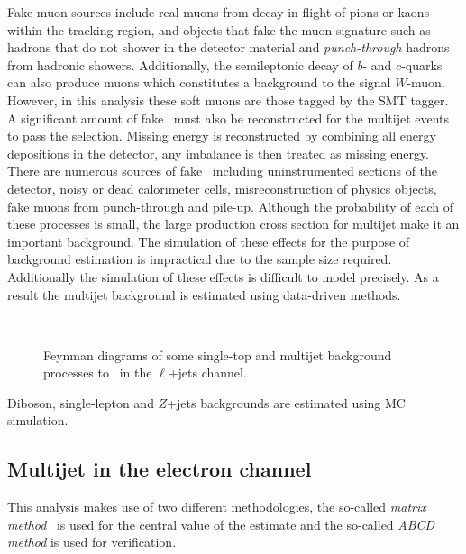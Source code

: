 Fake muon sources include real muons from decay-in-flight of pions or kaons within the tracking region, and objects that fake the muon signature such as hadrons that do not shower in the detector material and \emph{punch-through} hadrons from hadronic showers. Additionally, the semileptonic decay of $b$- and $c$-quarks can also produce muons which constitutes a background to the signal $W$-muon. However, in this analysis these soft muons are those tagged by the SMT tagger. A significant amount of fake \met\ must also be reconstructed for the multijet events to pass the selection. Missing energy is reconstructed by combining all energy depositions in the detector, any imbalance is then treated as missing energy. There are numerous sources of fake \met\ including uninstrumented sections of the detector, noisy or dead calorimeter cells, misreconstruction of physics objects, fake muons from punch-through and pile-up. Although the probability of each of these processes is small, the large production cross section for multijet make it an important background. The simulation of these effects for the purpose of background estimation is impractical due to the sample size required. Additionally the simulation of these effects is difficult to model precisely. As a result the multijet background is estimated using data-driven methods.

\begin{figure}[htbp]
  \centering
    \begin{minipage}[][][t]{.32\textwidth}
      \centering
        
      \label{fig:MultiJetBkgReal}
    \end{minipage}
    \,
    \begin{minipage}[][][t]{.32\textwidth}
      \centering
        
      \label{fig:MultiJetBkgFake}
    \end{minipage}
    \caption{Feynman diagrams of some single-top and multijet background processes to \ttbar\ in the $\ell$+jets channel.}
  \label{fig:MultiJetBkg}
\end{figure}

Diboson, single-lepton and $Z$+jets backgrounds are estimated using MC simulation.

\subsection{Multijet in the electron channel}
\label{sec:CrossMultijetElectron}
This analysis makes use of two different methodologies, the so-called \emph{matrix method}~\cite{CrossSection:MatrixMethod} is used for the central value of the estimate and the so-called \emph{ABCD method} is used for verification.

